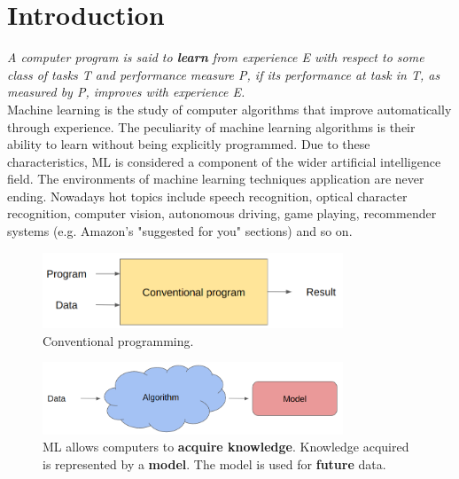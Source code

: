 \chapter{Introduction}
\label{cha:intro}

\textit{A computer program is said to \textbf{learn} from experience E with respect
to some class of tasks T and performance measure P, if its performance at task
in T, as measured by P, improves with experience E.}\\

Machine learning is the study of computer algorithms that improve automatically through
experience. The peculiarity of machine learning algorithms is their ability to
learn without being explicitly programmed. Due to these characteristics, ML is
considered a component of the wider artificial intelligence field. The environments
of machine learning techniques application are never ending. Nowadays hot topics
include speech recognition, optical character recognition, computer vision, autonomous
driving, game playing, recommender systems (e.g. Amazon's "suggested for you" sections)
and so on.

\begin{figure}
	\centering
	\includegraphics[width=0.8\textwidth]{
		images/01_Introduction_conventionalProgram.png
	}
	\caption{Conventional programming.}
	\label{fig:conventionalProgramming}
\end{figure}

\begin{figure}
	\centering
	\includegraphics[width=0.8\textwidth]{
		images/01_Introduction_machineLearning.png
	}
	\caption{ML allows computers to \textbf{acquire knowledge}. Knowledge acquired
	is represented by a \textbf{model}. The model is used for \textbf{future} data.}
	\label{fig:mlvsconventionalProgramming}
\end{figure}

